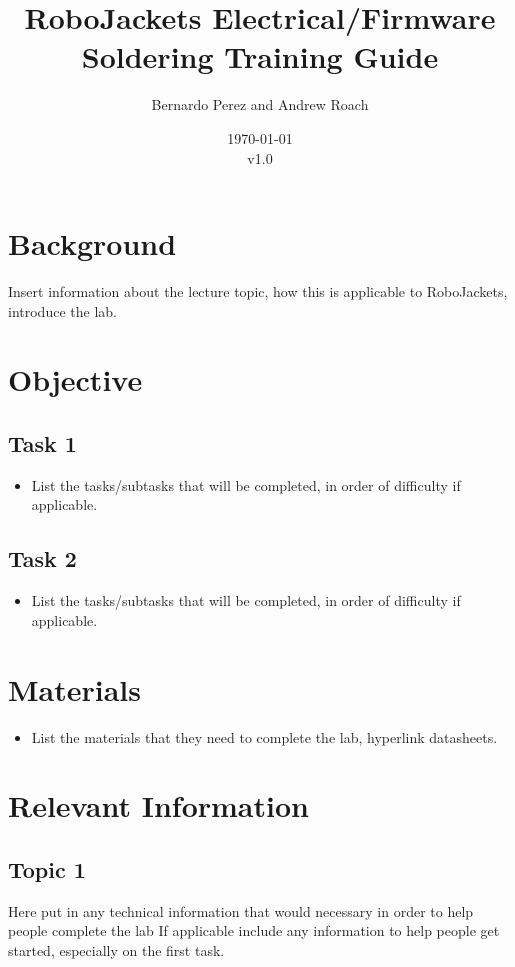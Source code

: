 \documentclass{article}
\title{RoboJackets Electrical/Firmware Soldering Training Guide}
\author{Bernardo Perez and Andrew Roach}
\date{\today\\v1.0}
\begin{document}
\maketitle{}
\setcounter{tocdepth}{2}
\tableofcontents
\pagebreak


\section{Background}
Insert information about the lecture topic, how this is applicable to RoboJackets, introduce the lab.

\section{Objective}
\subsection{Task 1}
\begin{itemize}
    \item List the tasks/subtasks that will be completed, in order of difficulty if applicable.
\end{itemize}
\subsection{Task 2}
\begin{itemize}
    \item List the tasks/subtasks that will be completed, in order of difficulty if applicable.
\end{itemize}
\section{Materials}
\begin{itemize}
	\item List the materials that they need to complete the lab, hyperlink datasheets.
\end{itemize}

\section{Relevant Information}
\subsection{Topic 1}
Here put in any technical information that would necessary in order to help people complete the lab
If applicable include any information to help people get started, especially on the first task.
\end{document}
